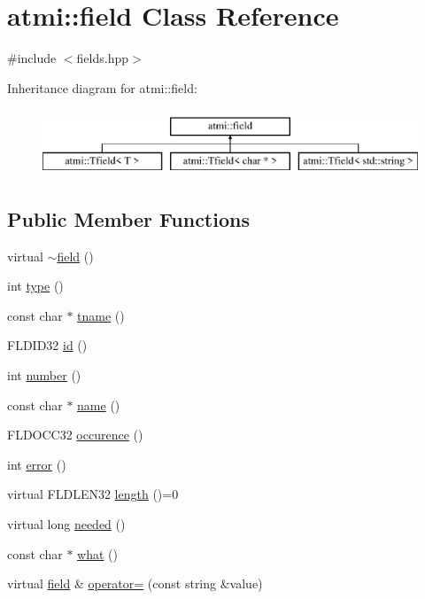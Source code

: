 \hypertarget{classatmi_1_1field}{}\section{atmi\+:\+:field Class Reference}
\label{classatmi_1_1field}


{\ttfamily \#include $<$fields.\+hpp$>$}

Inheritance diagram for atmi\+:\+:field\+:\begin{figure}[H]
\begin{center}
\leavevmode
\includegraphics[height=2.000000cm]{classatmi_1_1field}
\end{center}
\end{figure}
\subsection*{Public Member Functions}
\begin{DoxyCompactItemize}
\item 
virtual \hyperlink{classatmi_1_1field_a6f91cba3fca0a77fb7ad229187d689b9}{$\sim$field} ()
\item 
int \hyperlink{classatmi_1_1field_a717c701f07a784f471abb44d7bc95048}{type} ()
\item 
const char $\ast$ \hyperlink{classatmi_1_1field_a7d6260dd6f7c3c44de29190c2dfd546e}{tname} ()
\item 
F\+L\+D\+I\+D32 \hyperlink{classatmi_1_1field_a29384f1a15dc298b8fe4a41aa0746430}{id} ()
\item 
int \hyperlink{classatmi_1_1field_aa71d28f3df8490e9ed016607f857fae1}{number} ()
\item 
const char $\ast$ \hyperlink{classatmi_1_1field_a0fbc5a958a0af8286e339b088ee69bc8}{name} ()
\item 
F\+L\+D\+O\+C\+C32 \hyperlink{classatmi_1_1field_a161b9b7037c49fbcf86518fcb35e779c}{occurence} ()
\item 
int \hyperlink{classatmi_1_1field_a6d8db988f58f3779b0ef528a11b3466f}{error} ()
\item 
virtual F\+L\+D\+L\+E\+N32 \hyperlink{classatmi_1_1field_a296771293135085d91aa9aefd108d44d}{length} ()=0
\item 
virtual long \hyperlink{classatmi_1_1field_aef2940ef13d554b2a0090ea4052529d8}{needed} ()
\item 
const char $\ast$ \hyperlink{classatmi_1_1field_a396b41ad5ae2b1df362e446c5f090640}{what} ()
\item 
virtual \hyperlink{classatmi_1_1field}{field} \& \hyperlink{classatmi_1_1field_ac032afae0c1ebfc606f047ce1a32ac58}{operator=} (const string \&value)
\end{DoxyCompactItemize}
